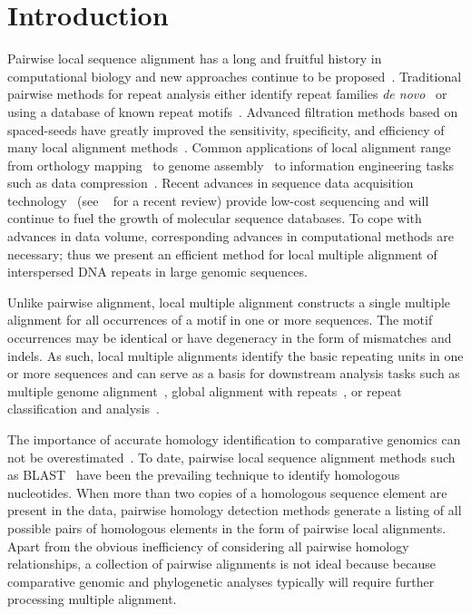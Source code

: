 \documentclass[9.5pt,journal,final,finalsubmission,twocolumn]{IEEEtran}
\begin{document}
\section{Introduction}
Pairwise local sequence alignment has a long and fruitful history in computational biology and new approaches continue to be proposed~\cite{ref-pattern,ref-chaos,ref-yass,ref-kahveciMAP}. Traditional pairwise methods for repeat analysis either identify repeat families \textit{de novo}~\cite{ref-reputer} or using a database of known repeat motifs~\cite{ref-repbase}. Advanced filtration methods based on spaced-seeds have greatly improved the sensitivity, specificity, and efficiency of many local alignment methods~\cite{ref-zhang04,ref-zhang06,ref-buhler05,ref-xu04,ref-batzoglouNAR, ref-rasmussen}. Common applications of local alignment range from orthology mapping~\cite{ref-orthomcl} to genome assembly~\cite{ref-arachne2} to information engineering tasks such as data compression~\cite{ref-ane}. Recent advances in sequence data acquisition technology~\cite{ref-454, sequencing, hybrid} (see ~\cite{ref-nextgenseq} for a recent review) provide low-cost sequencing and will continue to fuel the growth of molecular sequence databases. To cope with advances in data volume, corresponding advances in computational methods are necessary; thus we present an efficient method for local multiple alignment of interspersed DNA repeats in large genomic sequences.

Unlike pairwise alignment, local multiple alignment constructs a single multiple alignment for all occurrences of a motif in one or more sequences.  The motif occurrences may be identical or have degeneracy in the form of mismatches and indels.  As such, local multiple alignments identify the basic repeating units in one or
more sequences and can serve as a basis for downstream analysis tasks such as multiple genome alignment~\cite{ref-mauve,ref-mga,ref-mgcat,ref-deweyReview}, global alignment with repeats~\cite{ref-otherSammethPaper,ref-aba}, or repeat classification and analysis~\cite{ref-piler}.

The importance of accurate homology identification to comparative genomics can not be overestimated~\cite{Kumar07}. To date, pairwise local sequence alignment methods such as BLAST~\cite{ref-blastz,ref-ssearch} have been the prevailing technique to identify homologous nucleotides. When more than two copies of a homologous sequence element are present in the data, pairwise homology detection methods generate a listing of all possible pairs of homologous elements in the form of pairwise local alignments.  Apart from the obvious inefficiency of considering all pairwise homology relationships, a collection of pairwise alignments is not ideal because because comparative genomic and phylogenetic analyses typically will require further processing multiple alignment.
\end{document}
